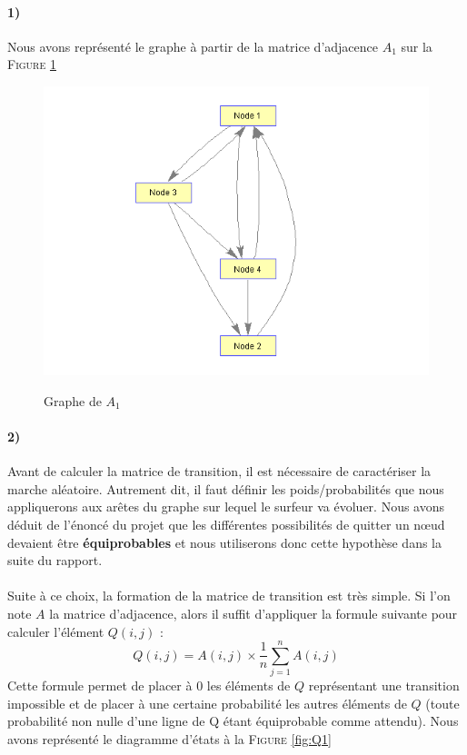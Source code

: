 \documentclass[a4paper,titlepage]{report}
\begin{document}
\paragraph{1)} Nous avons représenté le graphe à partir de la matrice d'adjacence $A_1$ sur la \textsc{Figure} \ref{fig:a1_graph}
\begin{figure}[h]
	\center
	\includegraphics[scale=0.45]{../images/a1_graph.png}\label{fig:a1_graph}
	\caption{Graphe de $A_1$}
\end{figure}
\paragraph{2)} Avant de calculer la matrice de transition, il est nécessaire de caractériser la marche aléatoire. Autrement dit, il faut définir les poids/probabilités que nous appliquerons aux arêtes du graphe sur lequel le surfeur va évoluer. Nous avons déduit de l'énoncé du projet que les différentes possibilités de quitter un nœud devaient être \textbf{équiprobables} et nous utiliserons donc cette hypothèse dans la suite du rapport.
\paragraph{}
Suite à ce choix, la formation de la matrice de transition est très simple. Si l'on note $A$ la matrice d'adjacence, alors il suffit d'appliquer la formule suivante pour calculer l'élément $Q(i,j)$ :
\[
Q(i,j) = A(i,j) \times \frac{1}{n}\sum\limits_{j = 1}^n A(i,j)
\]
Cette formule permet de placer à $0$ les éléments de $Q$ représentant une transition impossible et de placer à une certaine probabilité les autres éléments de $Q$ (toute probabilité non nulle d'une ligne de Q étant équiprobable comme attendu). Nous avons représenté le diagramme d'états à la \textsc{Figure} \ref{fig:Q1}
\end{document}

